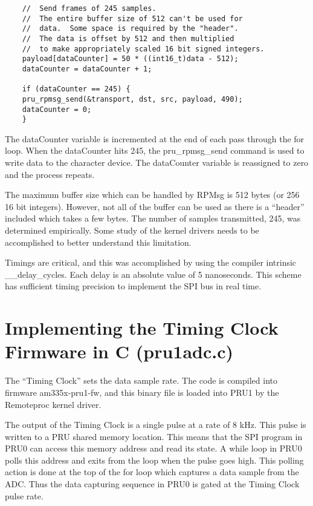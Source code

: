 \begin{verbatim}
    //  Send frames of 245 samples.
    //  The entire buffer size of 512 can't be used for
    //  data.  Some space is required by the "header".
    //  The data is offset by 512 and then multiplied
    //  to make appropriately scaled 16 bit signed integers.
    payload[dataCounter] = 50 * ((int16_t)data - 512);
    dataCounter = dataCounter + 1;
    
    if (dataCounter == 245) {
    pru_rpmsg_send(&transport, dst, src, payload, 490);
    dataCounter = 0;
    }
\end{verbatim}

The dataCounter variable is incremented at the end of each pass through the for loop.  When the dataCounter hits 245, the pru\_rpmsg\_send command is used to write data to the character device. The dataCounter variable is reassigned to zero and the process repeats.

The maximum buffer size which can be handled by RPMsg is 512 bytes (or 256 16 bit integers).  However, not all of the buffer can be used as there is a ``header'' included which takes a few bytes.  The number of samples transmitted, 245, was determined empirically.  Some study of the kernel drivers needs to be accomplished to better understand this limitation.

Timings are critical, and this was accomplished by using the compiler intrinsic \_\_delay\_cycles.  Each delay is an absolute value of 5 nanoseconds.  This scheme has sufficient timing precision to implement the SPI bus in real time.  

\section{Implementing the Timing Clock Firmware in C (pru1adc.c)}

The ``Timing Clock'' sets the data sample rate.  The code is compiled into firmware am335x-pru1-fw, and this binary file is loaded into PRU1 by the Remoteproc kernel driver.

The output of the Timing Clock is a single pulse at a rate of 8 kHz.  This pulse is written to a PRU shared memory location.  This means that the SPI program in PRU0 can access this memory address and read its state.  A while loop in PRU0 polls this address and exits from the loop when the pulse goes high.  This polling action is done at the top of the for loop which captures a data sample from the ADC.  Thus the data capturing sequence in PRU0 is gated at the Timing Clock pulse rate.

